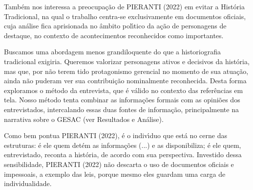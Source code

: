 \documentclass[
12pt,		%
openright,	%
twoside,  %
a4paper,			%
chapter=TITLE,		%
english,			%
french,				%
spanish,			%
brazil				%
]{USPSC-classe/USPSC}
\begin{document}
Tamb\'em nos interessa a preocupa\c{c}\~ao de  PIERANTI (2022) em evitar a Hist\'oria Tradicional, na qual o trabalho centra-se exclusivamente em documentos oficiais, cuja an\'alise fica aprisionada no \^ambito pol\'{\i}tico da a\c{c}\~ao de \textquotedbl personagens de destaque\textquotedbl , no contexto de \textquotedbl acontecimentos reconhecidos como importantes\textquotedbl .

















Buscamos uma abordagem menos grandiloquente do que a historiografia tradicional exigiria. Queremos valorizar personagens ativos e decisivos da hist\'oria, mas que, por n\~ao terem tido protagonismo gerencial no momento de sua atua\c{c}\~ao, ainda n\~ao puderam ver sua contribui\c{c}\~ao nominalmente reconhecida. Desta forma exploramos o m\'etodo da entrevista, que \'e v\'alido no contexto das refer\^encias em tela. Nosso m\'etodo tenta combinar as informa\c{c}\~oes formais com as opini\~oes dos entrevistados, intercalando essas duas fontes de informa\c{c}\~ao, principalmente na narrativa sobre o GESAC (ver Resultados e An\'alise).

















Como bem pontua  PIERANTI (2022), \textquotedbl \'e o indiv\'{\i}duo que est\'a no cerne das estruturas: \'e ele quem det\'em as informa\c{c}\~oes (...) e as disponibiliza; \'e ele quem, entrevistado, reconta a hist\'oria, de acordo com sua perspectiva\textquotedbl . Investido dessa sensibilidade,  PIERANTI (2022) n\~ao descarta o uso de documentos oficiais e impessoais, a exemplo das leis, porque mesmo eles \textquotedbl guardam uma carga de individualidade\textquotedbl .
\end{document}
